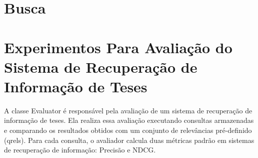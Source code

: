 \documentclass[
	12pt,				%
	openright,			%
	oneside,			%
	a4paper,			%
	english,			%
	french,				%
	spanish,			%
	brazil				%
	]{abntex2}
\begin{document}
%


\section{Busca}\label{sec:busca}



\section{Experimentos Para Avaliação do Sistema de Recuperação de Informação de Teses}\label{sec:experimentos-para-avaliacao-do-sistema-de-recuperacao-de-informacao-de-teses}

A classe Evaluator é responsável pela avaliação de um sistema de recuperação de informação de teses. Ela realiza essa avaliação executando consultas armazenadas e comparando os resultados obtidos com um conjunto de relevâncias pré-definido (qrels). Para cada consulta, o avaliador calcula duas métricas padrão em sistemas de recuperação de informação: Precisão e NDCG.
\end{document}

